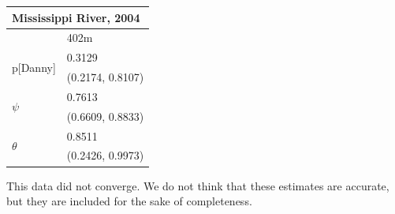 \documentclass[12pt]{article}
\begin{document}
    \begin{center}
    \begin{tabular}{|l|l|}
        \hline
        \multicolumn{2}{|l|}{\textbf{Mississippi River, 2004}} \\
        \hline
            & 402m \\
        \hline
        \multirow{2}{*}{p[Danny]}
            & 0.3129 \\
            & (0.2174, 0.8107) \\
        \hline
        \multirow{2}{*}{\(\psi\)}
            & 0.7613 \\
            & (0.6609, 0.8833) \\
        \hline
        \multirow{2}{*}{\(\theta\)}
            & 0.8511 \\
            & (0.2426, 0.9973) \\
        \hline
    \end{tabular}
    \end{center}

    This data did not converge. We do not think that these estimates are
    accurate, but they are included for the sake of completeness.
\end{document}
